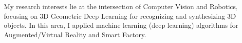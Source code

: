 


\begin{cventries}

\cvtext
{ %
\begin{cvitems}
My research interests lie at the intersection of Computer Vision and Robotics, focusing on 3D Geometric Deep Learning for recognizing and synthesizing 3D objects. In this area, I applied machine learning (deep learning) algorithms for Augmented/Virtual Reality and Smart Factory.
\end{cvitems}
}


\end{cventries}